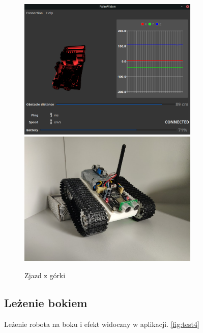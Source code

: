 \documentclass[12pt,a4paper,polish]{article}
\begin{document}
  \begin{figure}[h]
    \centering
    \includegraphics[width=0.77\textwidth]{img/final/3.png}
    \includegraphics[width=0.77\textwidth]{img/final/3e.jpg}
    \caption{Zjazd z górki}
    \label{fig:test3}
  \end{figure}


  \subsection{Leżenie bokiem}
  Leżenie robota na boku i efekt widoczny w aplikacji.
  \ref{fig:test4}
\end{document}

